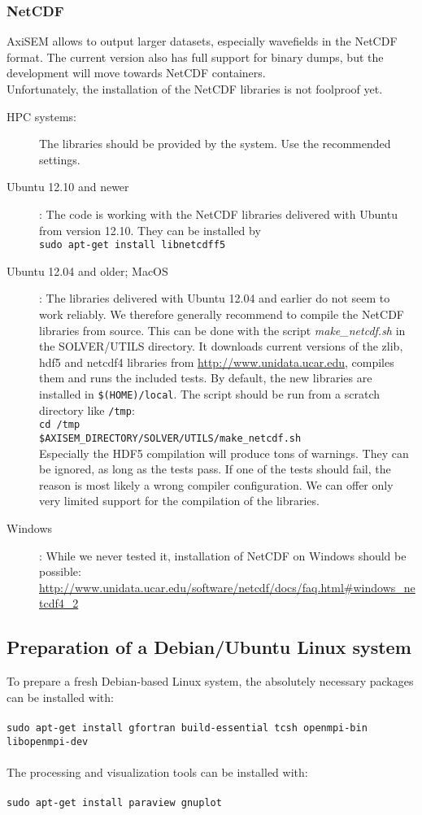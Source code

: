 \documentclass[11pt,letter,fleqn,english,notitlepage]{article}
\begin{document}
\subsubsection{NetCDF}
AxiSEM allows to output larger datasets, especially wavefields in the NetCDF format. The current version also has full support for binary dumps, but the development will move towards NetCDF containers.\\
Unfortunately, the installation of the NetCDF libraries is not foolproof yet.
\begin{description}
 \item[HPC systems:] The libraries should be provided by the system. Use the recommended settings.
 \item[Ubuntu 12.10 and newer]: The code is working with the NetCDF libraries delivered with Ubuntu from version 12.10. They can be installed by \\
 \verb|sudo apt-get install libnetcdff5|
 \item[Ubuntu 12.04 and older; MacOS]: The libraries delivered with Ubuntu 12.04 and earlier do not seem to work reliably. We therefore generally recommend to compile the NetCDF libraries from source. This can be done with the script \textit{make\_netcdf.sh} in the SOLVER/UTILS directory. It downloads current versions of the zlib, hdf5 and netcdf4 libraries from \url{http://www.unidata.ucar.edu}, compiles them and runs the included tests. By default, the new libraries are installed in \verb|$(HOME)/local|. The script should be run from a scratch directory like \verb|/tmp|:\\
 \verb|cd /tmp|\\
 \verb|$AXISEM_DIRECTORY/SOLVER/UTILS/make_netcdf.sh|\\
 Especially the HDF5 compilation will produce tons of warnings. They can be ignored, as long as the tests pass. If one of the tests should fail, the reason is most likely a wrong compiler configuration. We can offer only very limited support for the compilation of the libraries. 
 \item[Windows]: While we never tested it, installation of NetCDF on Windows should be possible:
 \url{http://www.unidata.ucar.edu/software/netcdf/docs/faq.html#windows_netcdf4_2}
\end{description}



\subsection{Preparation of a Debian/Ubuntu Linux system}
To prepare a fresh Debian-based Linux system, the absolutely necessary packages can be installed with:\\ \\
 \verb|sudo apt-get install gfortran build-essential tcsh openmpi-bin libopenmpi-dev|\\ \\
The processing and visualization tools can be installed with:\\ \\
 \verb|sudo apt-get install paraview gnuplot|
\end{document}
